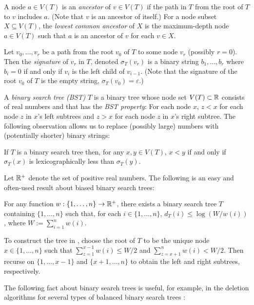 \documentclass[kpfonts]{patmorin}
\begin{document}
A node $a\in V(T)$ is an \emph{ancestor} of $v\in V(T)$ if the path in $T$ from the root of $T$ to $v$ includes $a$.  (Note that $v$ is an ancestor of itself.) For a node subset $X\subseteq V(T)$, the \emph{lowest common ancestor} of $X$ is the maximum-depth node $a\in V(T)$ such that $a$ is an ancestor of $v$ for each $v\in X$.

Let $v_0,\ldots,v_{r}$ be a path from the root $v_0$ of $T$ to some node $v_r$ (possibly $r=0$).  Then the \emph{signature} of $v_r$ in $T$, denoted $\sigma_T(v_r)$ is a binary string $b_1,\ldots,b_r$ where $b_i=0$ if and only if $v_{i}$ is the left child of $v_{i-1}$.  (Note that the signature of the root $v_0$ of $T$ is the empty string,  $\sigma_T(v_0)=\varepsilon$.)

A \emph{binary search tree (BST)} $T$ is a binary tree  whose node set $V(T)\subset\mathbb{R}$ consists of real numbers and that has the \emph{BST property}:  For each node $x$, $z<x$ for each node $z$ in $x$'s left subtrees and $z>x$ for each node $z$ in $x$'s right subtree. The following observation allows us to replace (possibly large) numbers with (potentially shorter) binary strings:

\begin{obs}
  If $T$ is a binary search tree then, for any $x,y\in V(T)$, $x<y$ if and only if $\sigma_T(x)$ is lexicographically less than $\sigma_T(y)$.
\end{obs}

Let $\mathbb{R}^+$ denote the set of positive real numbers. The following is an easy and often-used result about biased binary search trees:

\begin{lem}
  For any function $w:\{1,\ldots,n\}\to\mathbb{R}^+$, there exists a binary search tree $T$ containing $\{1,\ldots,n\}$ such that, for each $i\in\{1,\ldots,n\}$, $d_T(i)\le\log(W/w(i))$, where $W:=\sum_{i=1}^n w(i)$.
\end{lem}

To construct the tree in , choose the root of $T$ to be the unique node $x\in\{1,\ldots,n\}$ such that $\sum_{z=1}^{x-1} w(i)\le W/2$ and $\sum_{z=x+1}^{n} w(i)< W/2$.  Then recurse on $\{1,\ldots,x-1\}$ and $\{x+1,\ldots,n\}$ to obtain the left and right subtrees, respectively.

The following fact about binary search trees is useful, for example, in the deletion algorithms for several types of balanced binary search trees \cite[Section~6.2.3]{morin:open}:
\end{document}
